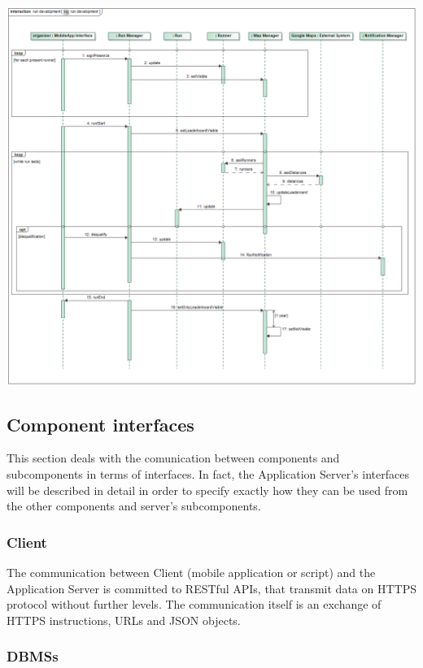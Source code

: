 \begin{center}
\includegraphics[scale=0.4]{sections/diagrams/run_development}
\newline
{}
\end{center}

\subsection{Component interfaces}
This section deals with the comunication between components and subcomponents in terms of interfaces. In fact, the Application Server's interfaces will be described in detail in order to specify exactly how they can be used from the other components and server's subcomponents.

\subsubsection{Client}

The communication between Client (mobile application or script) and the Application Server is committed to RESTful APIs, that transmit data on HTTPS protocol without further levels. The communication itself is an exchange of HTTPS instructions, URLs and JSON objects.

\subsubsection{DBMSs}

